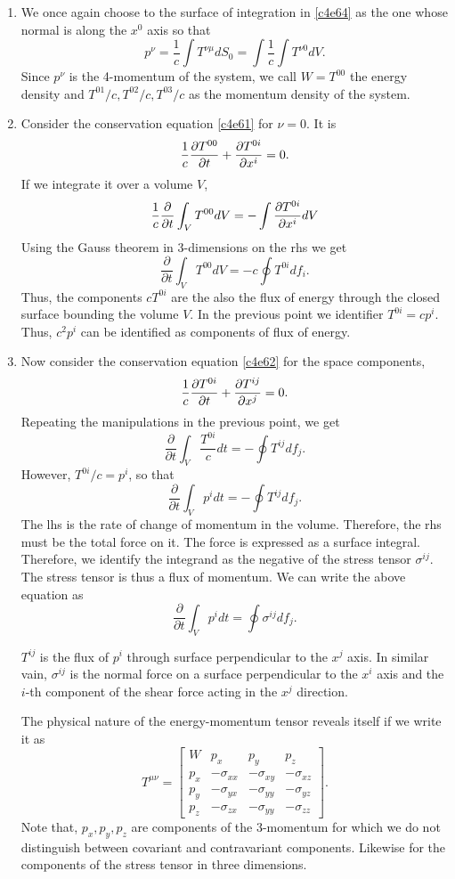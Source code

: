 \begin{enumerate}
\item We once again choose to the surface of integration in \eqref{c4e64} as the
one whose normal is along the $x^0$ axis so that
\[
p^\nu = \frac{1}{c}\int T^{\nu\mu}dS_0 = \int\frac{1}{c}\int T^{\nu 0}dV.
\]
Since $p^\nu$ is the 4-momentum of the system, we call $W = T^{00}$ the energy
density and $T^{01}/c, T^{02}/c, T^{03}/c$ as the momentum density of the 
system.

\item Consider the conservation equation \eqref{c4e61} for $\nu = 0$. It is
\[
\frac{1}{c}\frac{\partial{T^{00}}}{\partial{t}} + \frac{\partial{T^{0i}}}{\partial{x^i}} = 0.
\]
If we integrate it over a volume $V$, 
\[
\frac{1}{c}\frac{\partial}{\partial t}\int_V T^{00}dV = -\int\frac{\partial{T^{0i}}}{\partial{x^i}}dV
\]
Using the Gauss theorem in 3-dimensions on the rhs we get
\[
\frac{\partial}{\partial t}\int_V T^{00}dV = -c\oint T^{0i}df_i.
\]
Thus, the components $cT^{0i}$ are the also the flux of energy through the 
closed surface bounding the volume $V$. In the previous point we identifier 
$T^{0i} = cp^i$. Thus, $c^2p^i$ can be identified as components of flux of 
energy.

\item Now consider the conservation equation \eqref{c4e62} for the space
components,
\[
\frac{1}{c}\frac{\partial{T^{0i}}}{\partial{t}} + \frac{\partial{T^{ij}}}{\partial{x^j}} = 0.
\]
Repeating the manipulations in the previous point, we get
\[
\frac{\partial}{\partial t}\int_V \frac{T^{0i}}{c} dt = -\oint T^{ij}df_j.
\]
However, $T^{0i}/c = p^i$, so that
\[
\frac{\partial}{\partial t}\int_V p^i dt = -\oint T^{ij}df_j.
\]
The lhs is the rate of change of momentum in the volume. Therefore, the rhs must
be the total force on it. The force is expressed as a surface integral. 
Therefore, we identify the integrand as the negative of the stress tensor 
$\sigma^{ij}$. The stress tensor is thus a flux of momentum. We can write the 
above equation as
\begin{equation}\label{c4e74}
\frac{\partial}{\partial t}\int_V p^i dt = \oint \sigma^{ij}df_j.
\end{equation}

$T^{ij}$ is the flux of $p^i$ through surface perpendicular to the $x^j$ axis. 
In similar vain, $\sigma^{ij}$ is the normal force on a surface perpendicular to
the $x^i$ axis and the $i$-th component of the shear force acting in the $x^j$ 
direction.

The physical nature of the energy-momentum tensor reveals itself if we write 
it as
\begin{equation}\label{c4e75}
T^{\mu\nu} = \begin{bmatrix}
W & p_x & p_y & p_z \\
p_x & -\sigma_{xx} & -\sigma_{xy} & -\sigma_{xz} \\
p_y & -\sigma_{yx} & -\sigma_{yy} & -\sigma_{yz} \\
p_z & -\sigma_{zx} & -\sigma_{yy} & -\sigma_{zz}
\end{bmatrix}.
\end{equation}
Note that, $p_x, p_y, p_z$ are components of the 3-momentum for which we do not
distinguish between covariant and contravariant components. Likewise for the
components of the stress tensor in three dimensions.


\end{enumerate}
